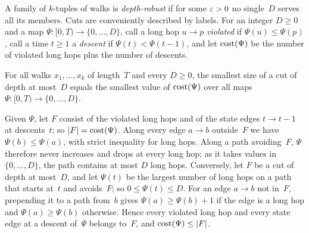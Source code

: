 A family of $k$-tuples of walks is \emph{depth-robust} if for some $\varepsilon>0$ no single~$D$ serves all its members.
Cuts are conveniently described by labels. For an integer $D\ge0$ and a map $\Psi\colon[0,T)\to\{0,\dots,D\}$, call a
long hop $u\to p$ \emph{violated} if $\Psi(u)\le\Psi(p)$, call a time $t\ge1$ a \emph{descent} if
$\Psi(t)<\Psi(t-1)$, and let $\mathrm{cost}(\Psi)$ be the number of violated long hops plus the number of descents.

\begin{lemma}\label{lem:dep-label}
\notformalized
For all walks $x_1,\dots,x_k$ of length~$T$ and every $D\ge0$, the smallest size of a cut of depth at most~$D$ equals
the smallest value of $\mathrm{cost}(\Psi)$ over all maps $\Psi\colon[0,T)\to\{0,\dots,D\}$.
\end{lemma}

\begin{informalproof}
Given $\Psi$, let $F$ consist of the violated long hops and of the state edges $t\to t-1$ at descents~$t$; so
$\lvert F \rvert=\mathrm{cost}(\Psi)$. Along every edge $a\to b$ outside~$F$ we have $\Psi(b)\le\Psi(a)$, with strict inequality for
long hops. Along a path avoiding~$F$, $\Psi$ therefore never increases and drops at every long hop; as it takes values
in $\{0,\dots,D\}$, the path contains at most $D$ long hops. Conversely, let $F$ be a cut of depth at most~$D$, and
let $\Psi(t)$ be the largest number of long hops on a path that starts at~$t$ and avoids~$F$; so
$0\le\Psi(t)\le D$. For an edge $a\to b$ not in~$F$, prepending it to a path from~$b$ gives
$\Psi(a)\ge\Psi(b)+1$ if the edge is a long hop and $\Psi(a)\ge\Psi(b)$ otherwise. Hence every violated long hop and
every state edge at a descent of~$\Psi$ belongs to~$F$, and $\mathrm{cost}(\Psi)\le\lvert F \rvert$.
\end{informalproof}

